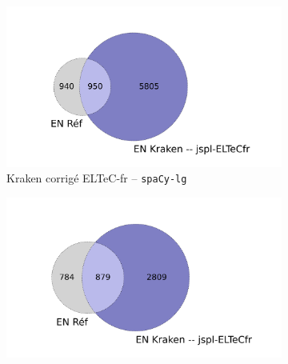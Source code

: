 \begin{figure}[h!]
\begin{minipage}{7cm}
  \begin{subfigure}{1\textwidth}
  \includegraphics[width=1\textwidth]{IMAGES/INTERSECTIONS_GLOBALES/ELTeCFRA_Kraken -- jspl-ELTeCfr_spacy-lg-concat_intersection.png} 
  \caption{Kraken corrigé ELTeC-fr -- \texttt{spaCy-lg}}
  \label{fig:ELTeCFRA_Kraken -- jspl-ELTeCfr_spacy-lg-concat_intersection}
  \end{subfigure}
  \end{minipage}
  \begin{minipage}{7cm}
  \begin{subfigure}{1\textwidth}
  \includegraphics[width=1\textwidth]{IMAGES/INTERSECTIONS_GLOBALES/ELTeCFRA_Kraken -- jspl-ELTeCfr_stanza-concat_intersection.png}

\end{subfigure}
\end{minipage}
\end{figure}
